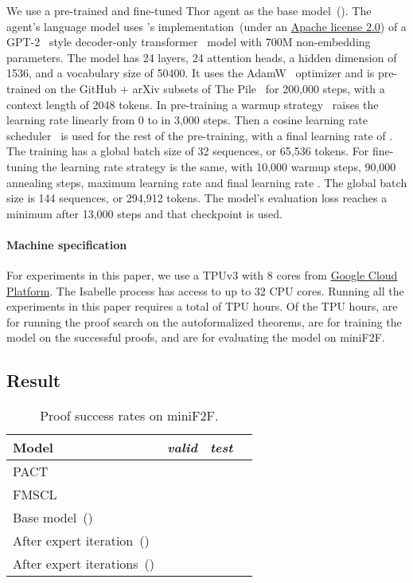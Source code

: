 \documentclass{article}
\begin{document}
We use a pre-trained and fine-tuned Thor agent as the base model~().
The agent's language model uses \citet{mesh-transformer-jax}'s implementation~(under an \href{https://github.com/kingoflolz/mesh-transformer-jax/blob/master/LICENSE.txt}{Apache license 2.0}) of a GPT-2~\citep{radford2019language} style decoder-only transformer~\citep{vaswani2017attention} model with 700M non-embedding parameters. The model has 24 layers, 24 attention heads, a hidden dimension of 1536, and a vocabulary size of 50400. It uses the AdamW~\citep{loshchilov2019adamw} optimizer and is pre-trained on the GitHub + arXiv subsets of The Pile~\citep{pile} for 200,000 steps, with a context length of 2048 tokens. In pre-training a warmup strategy~\citep{goyal2017accurate} raises the learning rate linearly from 0 to  in 3,000 steps. Then a cosine learning rate scheduler~\citep{DBLP:conf/iclr/LoshchilovH17} is used for the rest of the pre-training, with a final learning rate of . The training has a global batch size of 32 sequences, or 65,536 tokens. For fine-tuning the learning rate strategy is the same, with 10,000 warmup steps, 90,000 annealing steps, maximum learning rate  and final learning rate . The global batch size is 144 sequences, or 294,912 tokens. The model's evaluation loss reaches a minimum after 13,000 steps and that checkpoint is used.



\paragraph{Machine specification}
For experiments in this paper, we use a TPUv3 with 8 cores from \href{https://cloud.google.com/tpu?hl=en}{Google Cloud Platform}.
The Isabelle process has access to up to 32 CPU cores. Running all the experiments in this paper requires a total of  TPU hours. Of the  TPU hours,  are for running the proof search on the autoformalized theorems,  are for training the model on the successful proofs, and  are for evaluating the model on miniF2F.



\subsection{Result}
\begin{table}[t]
  
  \caption{Proof success rates on miniF2F.}
  \label{tab:minif2f}
  \centering
  \begin{tabular}{llll}
    \toprule
    Model   & \emph{valid} & \emph{test} \\ 
    \midrule
    
PACT~\citep{han2022pact}  &    & \\
    FMSCL~\citep{fmscl} &   &   \\
    Base model~()~\citep{jiang2022thor}             &  & \\
    After  expert iteration~()             &  & \\
    After  expert iterations~()             &  & {} \\
\bottomrule
  \end{tabular}
      \vspace{-5pt}
\end{table}
\end{document}
